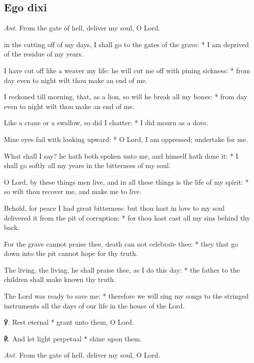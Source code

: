 \subsection{Ego dixi}\par\noindent
\textit{Ant.} From the gate of hell, {\dag} deliver my soul, O Lord.\par
{} in the cutting off of my days, {\dag} I shall go to the gates of the grave: * I am deprived of the residue of my years.\par
{}
I have cut off like a weaver my life: {\dag} he will cut me off with pining sickness: * from day even to night wilt thou make an end of me.\par
I reckoned till morning, {\dag} that, as a lion, so will he break all my bones: * from day even to night wilt thou make an end of me.\par
Like a crane or a swallow, so did I chatter: * I did mourn as a dove.\par
Mine eyes fail with looking upward: * O Lord, I am oppressed; undertake for me.\par
What shall I say? {\dag} he hath both spoken unto me, and himself hath done it: * I shall go softly all my years in the bitterness of my soul.\par
O Lord, by these things men live, {\dag} and in all these things is the life of my spirit: * so wilt thou recover me, and make me to live.\par
Behold, for peace I had great bitterness: {\dag} but thou hast in love to my soul delivered it from the pit of corruption: * for thou hast cast all my sins behind thy back.\par
For the grave cannot praise thee, {\dag} death can not celebrate thee: * they that go down into the pit cannot hope for thy truth.\par
The living, the living, he shall praise thee, as I do this day: * the father to the children shall make known thy truth.\par
The Lord was ready to save me: * therefore we will sing my songs to the stringed instruments all the days of our life in the house of the Lord.\par
℣. Rest eternal * grant unto them, O Lord.\par
℟. And let light perpetual * shine upon them.\par\noindent
\textit{Ant.} From the gate of hell, deliver my soul, O Lord.\par

